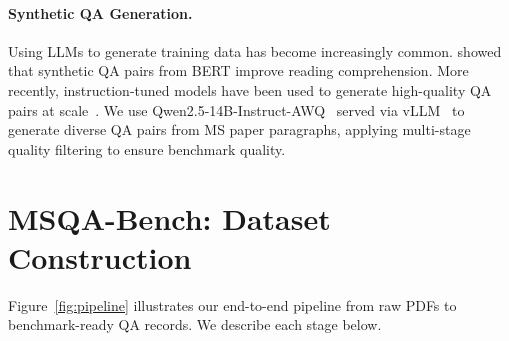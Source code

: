\documentclass[11pt]{article}
\begin{document}
\paragraph{Synthetic QA Generation.}
Using LLMs to generate training data has become increasingly common. \citet{alberti2019synthetic} showed that synthetic QA pairs from BERT improve reading comprehension. More recently, instruction-tuned models have been used to generate high-quality QA pairs at scale~\citep{wang2023self}. We use Qwen2.5-14B-Instruct-AWQ~\citep{qwen2025qwen25} served via vLLM~\citep{kwon2023efficient} to generate diverse QA pairs from MS paper paragraphs, applying multi-stage quality filtering to ensure benchmark quality.

\section{MSQA-Bench: Dataset Construction}
\label{sec:dataset}

Figure~\ref{fig:pipeline} illustrates our end-to-end pipeline from raw PDFs to benchmark-ready QA records. We describe each stage below.
\end{document}
